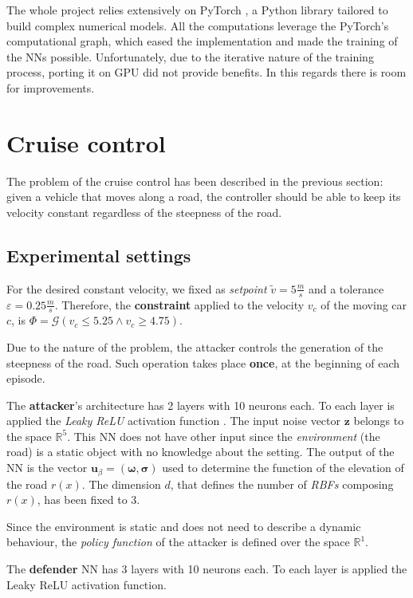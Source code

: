 The whole project relies extensively on PyTorch \cite{pytorch}, a Python library tailored to build complex numerical models.
All the computations leverage the PyTorch's computational graph, which eased the implementation and made the training of the NNs possible.
Unfortunately, due to the iterative nature of the training process, porting it on GPU did not provide benefits. In this regards there is room for improvements.


\section{Cruise control}
The problem of the cruise control has been described in the previous section: given a vehicle that moves along a road, the controller should be able to keep its velocity constant regardless of the steepness of the road.

\subsection{Experimental settings}
For the desired constant velocity, we fixed as \textit{setpoint} $\tilde{v} = 5 \frac{m}{s}$ and a tolerance $\varepsilon = 0.25 \frac{m}{s}$.
Therefore, the \textbf{constraint} applied to the velocity $v_c$ of the moving car $c$, is $\Phi = \mathcal{G}(v_c \leq 5.25 \wedge v_c \geq 4.75)$.

Due to the nature of the problem, the attacker controls the generation of the steepness of the road.
Such operation takes place \textbf{once}, at the beginning of each episode.

The \textbf{attacker}'s architecture has 2 layers with 10 neurons each.
To each layer is applied the \textit{Leaky ReLU} activation function \cite{xu2015empirical}.
The input noise vector $\textbf{z}$ belongs to the space $\mathbb{R}^5$.
This NN does not have other input since the \textit{environment} (the road) is a static object with no knowledge about the setting.
The output of the NN is the vector $\textbf{u}_\beta = (\pmb{\omega}, \pmb{\sigma})$ used to determine the function of the elevation of the road $r(x)$.
The dimension $d$, that defines the number of \textit{RBFs} composing $r(x)$, has been fixed to 3.

Since the environment is static and does not need to describe a dynamic behaviour, the \textit{policy function} of the attacker is defined over the space $\mathbb{R}^1$.

The \textbf{defender} NN has 3 layers with 10 neurons each.
To each layer is applied the {Leaky ReLU} activation function.

